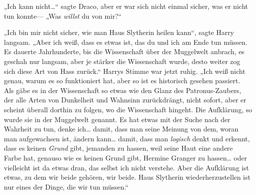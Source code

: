 „Ich kann nicht…“ sagte Draco, aber er war sich nicht einmal sicher, was er nicht tun konnte— „Was \emph{willst} du von mir?“

„Ich bin mir nicht sicher, wie man Haus Slytherin heilen kann“, sagte Harry langsam. „Aber ich weiß, dass es etwas ist, das du und ich am Ende tun müssen. Es dauerte Jahrhunderte, bis die Wissenschaft über der Muggelwelt anbrach, es geschah nur langsam, aber je stärker die Wissenschaft wurde, desto weiter zog sich diese Art von Hass zurück.“ Harrys Stimme war jetzt ruhig. „Ich weiß nicht genau, warum es so funktioniert hat, aber so ist es historisch gesehen passiert. Als gäbe es in der Wissenschaft so etwas wie den Glanz des Patronus-Zaubers, der alle Arten von Dunkelheit und Wahnsinn zurückdrängt, nicht sofort, aber er scheint überall dorthin zu folgen, wo die Wissenschaft hingeht. Die Aufklärung, so wurde sie in der Muggelwelt genannt.%
Es hat etwas mit der Suche nach der Wahrheit zu tun, denke ich… damit, dass man seine Meinung von dem, woran man aufgewachsen ist, ändern kann… damit, dass man \emph{logisch} denkt und erkennt, dass es keinen \emph{Grund} gibt, jemanden zu hassen, weil seine Haut eine andere Farbe hat, genauso wie es keinen Grund gibt, Hermine Granger zu hassen… oder vielleicht ist da etwas dran, das selbst ich nicht verstehe. Aber die Aufklärung ist etwas, zu dem wir beide gehören, wir beide. Haus Slytherin wiederherzustellen ist nur eines der Dinge, die wir tun müssen.“

